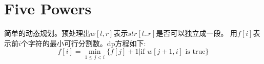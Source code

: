 \section{Five Powers}
简单的动态规划。预处理出$w[l,r]$表示$str[l..r]$是否可以独立成一段。
用$f[i]$表示前$i$个字符的最小可行分割数。dp方程如下:
\begin{displaymath}
f[i] = \min_{1 \le j < i}\{ f[j] + 1 | \text{if $w[j+1,i]$ is true} \}
\end{displaymath}

